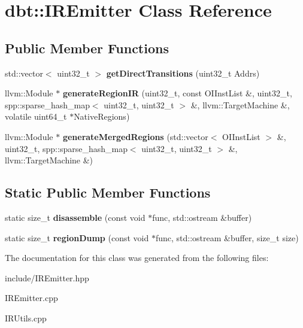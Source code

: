 \hypertarget{classdbt_1_1_i_r_emitter}{}\section{dbt\+:\+:I\+R\+Emitter Class Reference}
\label{classdbt_1_1_i_r_emitter}
\subsection*{Public Member Functions}
\begin{DoxyCompactItemize}
\item 
std\+::vector$<$ uint32\+\_\+t $>$ {\bfseries get\+Direct\+Transitions} (uint32\+\_\+t Addrs)\hypertarget{classdbt_1_1_i_r_emitter_a5ef6352dfc402795674f6f159035c385}{}\label{classdbt_1_1_i_r_emitter_a5ef6352dfc402795674f6f159035c385}

\item 
llvm\+::\+Module $\ast$ {\bfseries generate\+Region\+IR} (uint32\+\_\+t, const O\+I\+Inst\+List \&, uint32\+\_\+t, spp\+::sparse\+\_\+hash\+\_\+map$<$ uint32\+\_\+t, uint32\+\_\+t $>$ \&, llvm\+::\+Target\+Machine \&, volatile uint64\+\_\+t $\ast$Native\+Regions)\hypertarget{classdbt_1_1_i_r_emitter_aa7ba17ebd138f6d47887b07da68c55bb}{}\label{classdbt_1_1_i_r_emitter_aa7ba17ebd138f6d47887b07da68c55bb}

\item 
llvm\+::\+Module $\ast$ {\bfseries generate\+Merged\+Regions} (std\+::vector$<$ O\+I\+Inst\+List $>$ \&, uint32\+\_\+t, spp\+::sparse\+\_\+hash\+\_\+map$<$ uint32\+\_\+t, uint32\+\_\+t $>$ \&, llvm\+::\+Target\+Machine \&)\hypertarget{classdbt_1_1_i_r_emitter_a3d8a68fc7fb73739ea2de082419e4bf8}{}\label{classdbt_1_1_i_r_emitter_a3d8a68fc7fb73739ea2de082419e4bf8}

\end{DoxyCompactItemize}
\subsection*{Static Public Member Functions}
\begin{DoxyCompactItemize}
\item 
static size\+\_\+t {\bfseries disassemble} (const void $\ast$func, std\+::ostream \&buffer)\hypertarget{classdbt_1_1_i_r_emitter_a90567800f6b634500ab95097ab717aea}{}\label{classdbt_1_1_i_r_emitter_a90567800f6b634500ab95097ab717aea}

\item 
static size\+\_\+t {\bfseries region\+Dump} (const void $\ast$func, std\+::ostream \&buffer, size\+\_\+t size)\hypertarget{classdbt_1_1_i_r_emitter_ae37ff1644a96df74589e490694ee6641}{}\label{classdbt_1_1_i_r_emitter_ae37ff1644a96df74589e490694ee6641}

\end{DoxyCompactItemize}


The documentation for this class was generated from the following files\+:\begin{DoxyCompactItemize}
\item 
include/I\+R\+Emitter.\+hpp\item 
I\+R\+Emitter.\+cpp\item 
I\+R\+Utils.\+cpp\end{DoxyCompactItemize}
